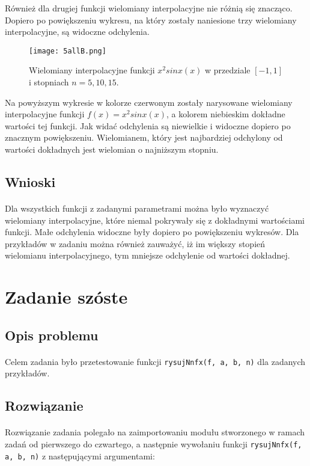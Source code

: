 \documentclass[a4paper]{article}
\theoremstyle{plain}
\begin{document}
Również dla drugiej funkcji wielomiany interpolacyjne nie różnią się znacząco. Dopiero po powiększeniu wykresu, na który zostały naniesione trzy wielomiany interpolacyjne, są widoczne odchylenia.

\begin{figure}[htbp]
  \centering
  \texttt{[image: 5allB.png]}
  \caption{Wielomiany interpolacyjne funkcji $x^2sinx(x)$ w przedziale $[-1, 1]$ i stopniach $n = 5, 10, 15$.}
\end{figure}

Na powyższym wykresie w kolorze czerwonym zostały narysowane wielomiany interpolacyjne funkcji $f(x) = x^2sinx(x)$, a kolorem niebieskim dokładne wartości tej funkcji. Jak widać odchylenia są niewielkie i widoczne dopiero po znacznym powiększeniu. Wielomianem, który jest najbardziej odchylony od wartości dokładnych jest wielomian o najniższym stopniu.
\subsection{Wnioski}
\paragraph{}
Dla wszystkich funkcji z zadanymi parametrami można było wyznaczyć wielomiany interpolacyjne, które niemal pokrywały się z dokładnymi wartościami funkcji. Małe odchylenia widoczne były dopiero po powiększeniu wykresów. Dla przykładów w zadaniu można również zauważyć, iż im większy stopień wielomianu interpolacyjnego, tym mniejsze odchylenie od wartości dokładnej.

\section{Zadanie szóste}

\subsection{Opis problemu}
\paragraph{}
Celem zadania było przetestowanie funkcji \texttt{rysujNnfx(f, a, b, n)} dla zadanych przykładów.

\subsection{Rozwiązanie}
\paragraph{}
Rozwiązanie zadania polegało na zaimportowaniu modułu stworzonego w ramach zadań od pierwszego do czwartego, a następnie wywołaniu funkcji \texttt{rysujNnfx(f, a, b, n)} z następującymi argumentami:
\end{document}
